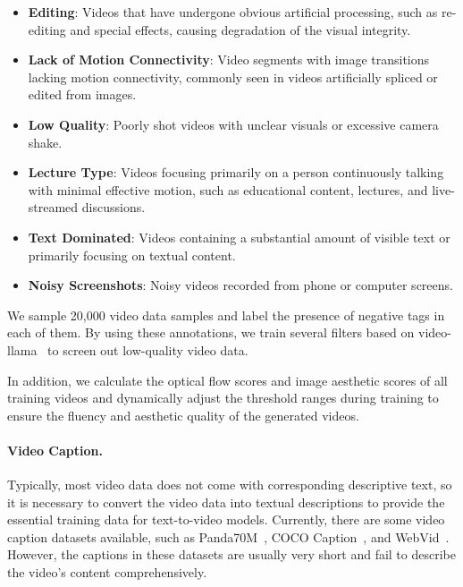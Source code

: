 \documentclass{article} \usepackage{iclr2024_conference,times}
\begin{document}
\begin{itemize}
    \item \textbf{Editing}: Videos that have undergone obvious artificial processing, such as re-editing and special effects, causing degradation of the visual integrity.
    \item \textbf{Lack of Motion Connectivity}: Video segments with image transitions lacking motion connectivity, commonly seen in videos artificially spliced or edited from images.
    \item \textbf{Low Quality}: Poorly shot videos with unclear visuals or excessive camera shake.
    \item \textbf{Lecture Type}: Videos focusing primarily on a person continuously talking with minimal effective motion, such as educational content, lectures, and live-streamed discussions.
    \item \textbf{Text Dominated}: Videos containing a substantial amount of visible text or primarily focusing on textual content.
    \item \textbf{Noisy Screenshots}: Noisy videos recorded from phone or computer screens.
\end{itemize}

We sample 20,000 video data samples and label the presence of negative tags in each of them. 
By using these annotations, we train several filters based on video-llama~\cite{zhang2023video}  to screen out low-quality video data. 


In addition, we calculate the optical flow scores and image aesthetic scores of all training videos and dynamically adjust the threshold ranges during training  to ensure the fluency and aesthetic quality of the generated videos. 




\paragraph{Video Caption.} 
Typically, most video data does not come with corresponding descriptive text, so it is necessary to convert the video data into textual descriptions to provide the essential training data for text-to-video models. 
Currently, there are some video caption datasets available, such as Panda70M~\cite{chen2024panda}, COCO Caption~\cite{lin2014microsoft}, and WebVid~\cite{bain2021frozen}. 
However, the captions in these datasets are usually very short and fail to describe the video's content comprehensively. 
\end{document}
